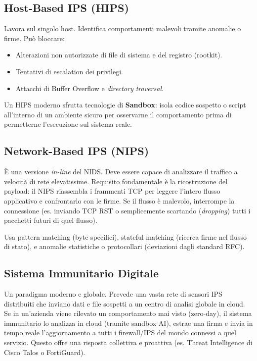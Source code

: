 \subsection{Host-Based IPS (HIPS)}
Lavora sul singolo host. Identifica comportamenti malevoli tramite anomalie o firme.
Può bloccare:
\begin{itemize}
    \item Alterazioni non autorizzate di file di sistema e del registro (rootkit).
    \item Tentativi di escalation dei privilegi.
    \item Attacchi di Buffer Overflow e \textit{directory traversal}.
\end{itemize}
Un HIPS moderno sfrutta tecnologie di \textbf{Sandbox}: isola codice sospetto o script all'interno di un ambiente sicuro per osservarne il comportamento prima di permetterne l'esecuzione sul sistema reale.

\subsection{Network-Based IPS (NIPS)}
È una versione \textit{in-line} del NIDS. Deve essere capace di analizzare il traffico a velocità di rete elevatissime.
Requisito fondamentale è la ricostruzione del payload: il NIPS riassembla i frammenti TCP per leggere l'intero flusso applicativo e confrontarlo con le firme. Se il flusso è malevolo, interrompe la connessione (es. inviando TCP RST o semplicemente scartando (\textit{dropping}) tutti i pacchetti futuri di quel flusso).

Usa pattern matching (byte specifici), stateful matching (ricerca firme nel flusso di stato), e anomalie statistiche o protocollari (deviazioni dagli standard RFC).

\subsection{Sistema Immunitario Digitale}
Un paradigma moderno e globale. Prevede una vasta rete di sensori IPS distribuiti che inviano dati e file sospetti a un centro di analisi globale in cloud.
Se in un'azienda viene rilevato un comportamento mai visto (zero-day), il sistema immunitario lo analizza in cloud (tramite sandbox AI), estrae una firma e invia in tempo reale l'aggiornamento a tutti i firewall/IPS del mondo connessi a quel servizio. Questo offre una risposta collettiva e proattiva (es. Threat Intelligence di Cisco Talos o FortiGuard).
